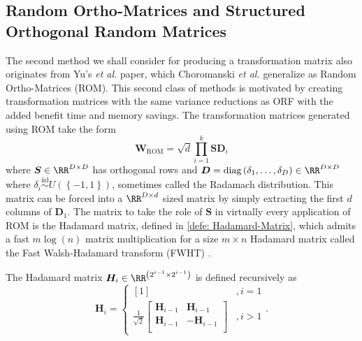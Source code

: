 \subsection{Random Ortho-Matrices and Structured Orthogonal Random Matrices}\label{Section3.3}

The second method we shall consider for producing a transformation matrix also originates from Yu's {\it et al.} paper, which Choromanski {\it et al.} \cite{ChoromanskiKrzysztof2017TUEo} generalize as Random Ortho-Matrices (ROM). This second class of methods is motivated by creating transformation matrices with the same variance reductions as ORF with the added benefit time and memory savings. The transformation matrices generated using ROM take the form
\begin{equation} \label{eq: ROM-general}
    \bm{W}_{\text{ROM}} = \sqrt{d} \prod_{i=1}^{k} \bm{S} \bm{D}_{i}
\end{equation}
where $\bm{S} \in \RR^{D \times D}$ has orthogonal rows and $\bm{D} = \operatorname{diag} \left( \delta_1 , \ldots , \delta_D \right) \in \RR^{D \times D}$ where $\delta_i \stackrel{\text{iid}}{\sim} U \left( \left\{ -1, 1 \right\} \right)$, sometimes called the Radamach distribution. This matrix can be forced into a $\RR^{D \times d}$ sized matrix by simply extracting the first $d$ columns of $\bm{D}_1$. The matrix to take the role of $\bm{S}$ in virtually every application of ROM is the Hadamard matrix, defined in \ref{defe: Hadamard-Matrix}, which admits a fast $m \log (n)$ matrix multiplication for a size $m \times n$ Hadamard matrix called the Fast Walsh-Hadamard transform (FWHT) \cite{Fino1976UMTo}.

\begin{defe} \label{defe: Hadamard-Matrix}
    The Hadamard matrix $\bm{H}_i \in \RR^{\left( 2^{i-1} \times 2^{i-1} \right)}$ is defined recursively as
    \[
        \bm{H}_i =
        \left\{
        \begin{array}{cc}
            \left[ 1 \right] & , i=1 \\
            \frac{1}{\sqrt{2}}
            \begin{bmatrix}
                \bm{H}_{i-1} & \bm{H}_{i-1}   \\
                \bm{H}_{i-1} & - \bm{H}_{i-1} \\
            \end{bmatrix}
                             & , i>1
        \end{array}
        \right. .
    \]
\end{defe}

